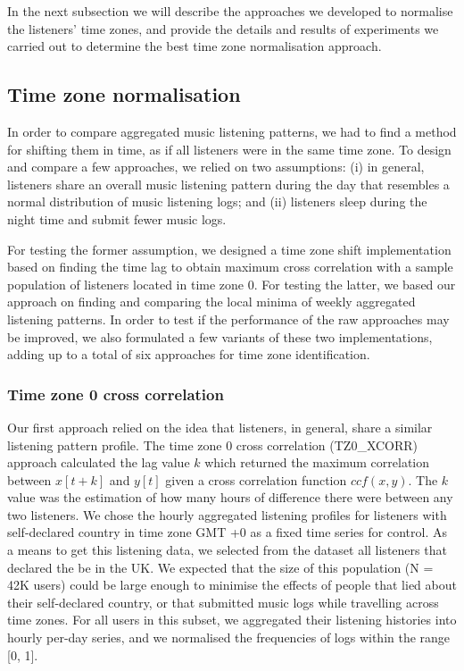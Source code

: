 In the next subsection we will describe the approaches we developed to normalise the listeners' time zones, and provide the details and results of experiments we carried out to determine the best time zone normalisation approach.

\subsection{Time zone normalisation}
In order to compare aggregated music listening patterns, we had to find a method for shifting them in time, as if all listeners were in the same time zone. To design and compare a few approaches, we relied on two assumptions: 
(i) in general, listeners share an overall music listening pattern during the day that resembles a normal distribution of music listening logs; 
and (ii) listeners sleep during the night time and submit fewer music logs.  

For testing the former assumption, we designed a time zone shift implementation based on finding the time lag to obtain maximum cross correlation with a sample population of listeners located in time zone 0. For testing the latter, we based our approach on finding and comparing the local minima of weekly aggregated listening patterns.
In order to test if the performance of the raw approaches may be improved, we also formulated a few variants of these two implementations, adding up to a total of six approaches for time zone identification. 


\subsubsection{Time zone 0 cross correlation}
Our first approach relied on the idea that listeners, in general, share a similar listening pattern profile. 
The time zone 0 cross correlation (TZ0\_XCORR) approach calculated the lag value $k$ which returned the maximum correlation between $x[t+k]$ and $y[t]$ given a cross correlation function $ccf(x, y)$. The $k$ value was the estimation of how many hours of difference there were between any two listeners. 
We chose the hourly aggregated listening profiles for listeners with self-declared country in time zone GMT +0 as a fixed time series for control. 
As a means to get this listening data, we selected from the dataset all listeners that declared the be in the UK. We expected that the size of this population (N = 42K users) could be large enough to minimise the effects of people that lied about their self-declared country, or that submitted music logs while travelling across time zones. 
For all users in this subset, we aggregated their listening histories into hourly per-day series, and we normalised the frequencies of logs within the range [0, 1]. 

